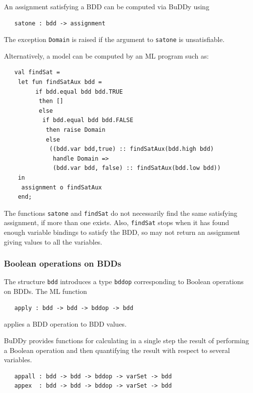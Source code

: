 \documentclass[12pt,fleqn]{book}
\renewcommand{\t}[1]{\mbox{\tt #1}}
\newcommand{\Buddy}{BuDDy{}}
\begin{document}
An assignment satisfying a BDD can be computed via \Buddy{} using

\begin{verbatim}
   satone : bdd -> assignment
\end{verbatim}

The exception \t{Domain} is raised if the argument to \t{satone} is unsatisfiable.

Alternatively, a model can be computed by an ML program such as:

\begin{verbatim}
   val findSat =
    let fun findSatAux bdd = 
         if bdd.equal bdd bdd.TRUE
          then []
          else
           if bdd.equal bdd bdd.FALSE
            then raise Domain
            else
             ((bdd.var bdd,true) :: findSatAux(bdd.high bdd) 
              handle Domain =>
              (bdd.var bdd, false) :: findSatAux(bdd.low bdd))
    in
     assignment o findSatAux
    end;
\end{verbatim}

The functions \t{satone} and \t{findSat} do not necessarily find the
same satisfying assignment, if more than one exists. Also,
\t{findSat} stops when it has found enough variable bindings to
satisfy the BDD, so may not return an assignment giving values to all
the variables.

\subsubsection{Boolean operations on BDDs}\label{app}

The structure \t{bdd} introduces a type \t{bddop}
corresponding to Boolean operations on BDDs. 
The ML function

\begin{verbatim}
   apply : bdd -> bdd -> bddop -> bdd
\end{verbatim}

applies a BDD operation to BDD values.

\Buddy{} provides functions for calculating in a single step the
result of performing a Boolean operation and then quantifying the
result with respect to several variables.

\begin{verbatim}
   appall : bdd -> bdd -> bddop -> varSet -> bdd
   appex  : bdd -> bdd -> bddop -> varSet -> bdd
\end{verbatim}
\end{document}

